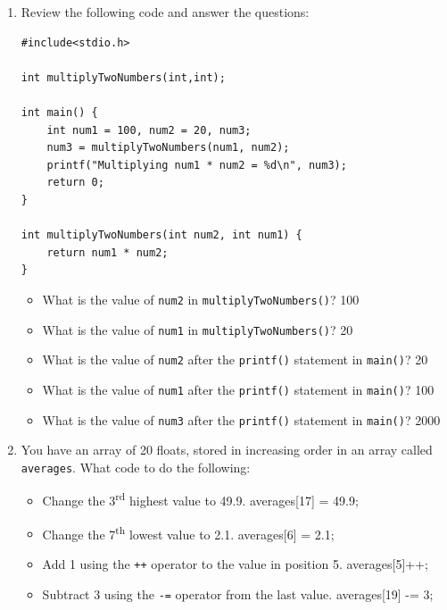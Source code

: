 \documentclass[letter,11pt]{article}
\begin{document}
\begin{enumerate}
    \item Review the following code and answer the questions:
    \begin{verbatim}
#include<stdio.h>

int multiplyTwoNumbers(int,int);

int main() {
    int num1 = 100, num2 = 20, num3;
    num3 = multiplyTwoNumbers(num1, num2);
    printf("Multiplying num1 * num2 = %d\n", num3);
    return 0;
}

int multiplyTwoNumbers(int num2, int num1) {
    return num1 * num2;
}
    \end{verbatim}
    \begin{itemize}
        \item What is the value of \texttt{num2} in \texttt{multiplyTwoNumbers()}? {\color{red}100}
        \item What is the value of \texttt{num1} in \texttt{multiplyTwoNumbers()}? {\color{red}20}
        \item What is the value of \texttt{num2} after the \texttt{printf()} statement in \texttt{main()}? {\color{red}20}
        \item What is the value of \texttt{num1} after the \texttt{printf()} statement in \texttt{main()}? {\color{red}100}
        \item What is the value of \texttt{num3} after the \texttt{printf()} statement in \texttt{main()}? {\color{red}2000}
    \end{itemize}
    
    \item You have an array of 20 floats, stored in increasing order in an array called \texttt{averages}. What code to do the following:
    \begin{itemize}
        \item Change the 3\textsuperscript{rd} highest value to 49.9. {\color{red}averages[17] = 49.9;}
        \item Change the 7\textsuperscript{th} lowest value to 2.1. {\color{red}averages[6] = 2.1;}
        \item Add 1 using the \texttt{++} operator to the value in position 5. {\color{red}averages[5]++;}
        \item Subtract 3 using the \texttt{-=} operator from the last value. {\color{red}averages[19] -= 3;}
    \end{itemize}
\end{enumerate}
\end{document}
